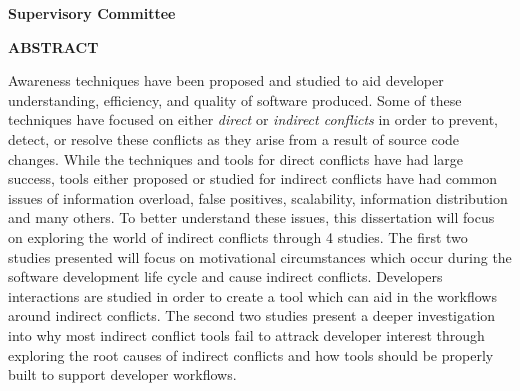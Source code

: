 \newpage
{}

\noindent \textbf{Supervisory Committee}
\tpbreak
\panel

\begin{center}
\textbf{ABSTRACT}
\end{center}

Awareness techniques have been proposed and studied to aid developer
understanding, efficiency, and quality of software produced. Some of these techniques have focused 
on either \textit{direct} or 
\textit{indirect conflicts} in order to prevent, detect, or resolve these conflicts as they arise
from a result of source code changes. While the techniques and tools for direct conflicts have had
large success, tools either proposed or studied for indirect conflicts have had common issues of
information overload, false positives, scalability, information distribution and many others. 
To better understand these issues, this dissertation will focus on exploring the world of indirect conflicts
through 4 studies. The first two studies presented will focus on motivational circumstances which occur
during the software development life cycle and cause indirect conflicts. Developers interactions are
studied in order to create a tool which can aid in the workflows around indirect conflicts. The second
two studies present a deeper investigation into why most indirect conflict tools fail to attrack developer
interest through exploring the root causes of indirect conflicts and how tools should be properly built
to support developer workflows.
